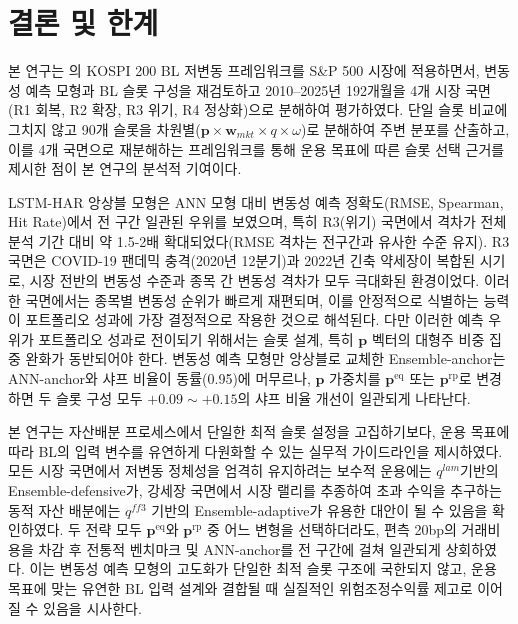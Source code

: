 \documentclass{article}
\begin{document}
\section{결론 및 한계}\label{sec:conclusion}

본 연구는 \citet{pyo2018}의 KOSPI 200 BL 저변동 프레임워크를 S\&P 500 시장에 적용하면서, 변동성 예측 모형과 BL 슬롯 구성을 재검토하고 2010--2025년 192개월을 4개 시장 국면(R1 회복, R2 확장, R3 위기, R4 정상화)으로 분해하여 평가하였다. 단일 슬롯 비교에 그치지 않고 90개 슬롯을 차원별($\mathbf{p} \times \mathbf{w}_{mkt} \times q \times \omega$)로 분해하여 주변 분포를 산출하고, 이를 4개 국면으로 재분해하는 프레임워크를 통해 운용 목표에 따른 슬롯 선택 근거를 제시한 점이 본 연구의 분석적 기여이다.

LSTM-HAR 앙상블 모형은 ANN 모형 대비 변동성 예측 정확도(RMSE, Spearman, Hit Rate)에서 전 구간 일관된 우위를 보였으며, 특히 R3(위기) 국면에서 격차가 전체 분석 기간 대비 약 1.5-2배 확대되었다(RMSE 격차는 전구간과 유사한 수준 유지). R3 국면은 COVID-19 팬데믹 충격(2020년 1\textendash 2분기)과 2022년 긴축 약세장이 복합된 시기로, 시장 전반의 변동성 수준과 종목 간 변동성 격차가 모두 극대화된 환경이었다. 이러한 국면에서는 종목별 변동성 순위가 빠르게 재편되며, 이를 안정적으로 식별하는 능력이 포트폴리오 성과에 가장 결정적으로 작용한 것으로 해석된다. 다만 이러한 예측 우위가 포트폴리오 성과로 전이되기 위해서는 슬롯 설계, 특히 $\mathbf{p}$ 벡터의 대형주 비중 집중 완화가 동반되어야 한다. 변동성 예측 모형만 앙상블로 교체한 Ensemble-anchor는 ANN-anchor와 샤프 비율이 동률(0.95)에 머무르나, $\mathbf{p}$ 가중치를 $\mathbf{p}^{\mathrm{eq}}$ 또는 $\mathbf{p}^{\mathrm{rp}}$로 변경하면 두 슬롯 구성 모두 $+0.09 \sim +0.15$의 샤프 비율 개선이 일관되게 나타난다.

본 연구는 자산배분 프로세스에서 단일한 최적 슬롯 설정을 고집하기보다, 운용 목표에 따라 BL의 입력 변수를 유연하게 다원화할 수 있는 실무적 가이드라인을 제시하였다. 모든 시장 국면에서 저변동 정체성을 엄격히 유지하려는 보수적 운용에는 $q^{lam}$‬기반의 Ensemble-defensive가, 강세장 국면에서 시장 랠리를 추종하여 초과 수익을 추구하는 동적 자산 배분에는 $q^{ff3}$‬ 기반의 Ensemble-adaptive가 유용한 대안이 될 수 있음을 확인하였다. 두 전략 모두 $\mathbf{p}^{\mathrm{eq}}$와 $\mathbf{p}^{\mathrm{rp}}$‬ 중 어느 변형을 선택하더라도, 편측 20bp의 거래비용을 차감 후 전통적 벤치마크 및 ANN-anchor를 전 구간에 걸쳐 일관되게 상회하였다. 이는 변동성 예측 모형의 고도화가 단일한 최적 슬롯 구조에 국한되지 않고, 운용 목표에 맞는 유연한 BL 입력 설계와 결합될 때 실질적인 위험조정수익률 제고로 이어질 수 있음을 시사한다.
\end{document}
